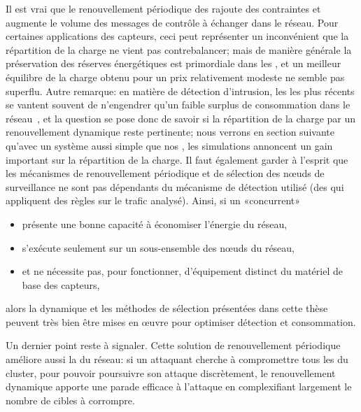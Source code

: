 Il est vrai que le renouvellement périodique des \cns rajoute des contraintes et augmente le volume des messages de contrôle à échanger dans le réseau.
Pour certaines applications des capteurs, ceci peut représenter un inconvénient que la répartition de la charge ne vient pas contrebalancer; mais de manière générale la préservation des réserves énergétiques est primordiale dans les \rcs, et un meilleur équilibre de la charge obtenu pour un prix relativement modeste ne semble pas superflu.
Autre remarque: en matière de détection d'intrusion, les \IDS les plus récents se vantent souvent de n'engendrer qu'un faible surplus de consommation dans le réseau~\cite{LZYP08}, et la question se pose donc de savoir si la répartition de la charge par un renouvellement dynamique reste pertinente; nous verrons en section suivante qu'avec un système aussi simple que nos \cns, les simulations annoncent un gain important sur la répartition de la charge.
Il faut également garder à l'esprit que les mécanismes de renouvellement périodique et de sélection des nœuds de surveillance ne sont pas dépendants du mécanisme de détection utilisé (\cad des \cns qui appliquent des règles sur le trafic analysé).
Ainsi, si un \IDS «concurrent»
\begin{itemize}
    \item présente une bonne capacité à économiser l'énergie du réseau,
    \item s'exécute seulement sur un sous-ensemble des nœuds du réseau,
    \item et ne nécessite pas, pour fonctionner, d'équipement distinct du matériel de base des capteurs,
\end{itemize}
alors la dynamique et les méthodes de sélection présentées dans cette thèse peuvent très bien être mises en œuvre pour optimiser détection et consommation.

Un dernier point reste à signaler.
Cette solution de renouvellement périodique améliore aussi la \secu du réseau: si un attaquant cherche à compromettre tous les \cns du cluster, pour pouvoir poursuivre son attaque discrètement, le renouvellement dynamique apporte une parade efficace à l'attaque en complexifiant largement le nombre de cibles à corrompre.

